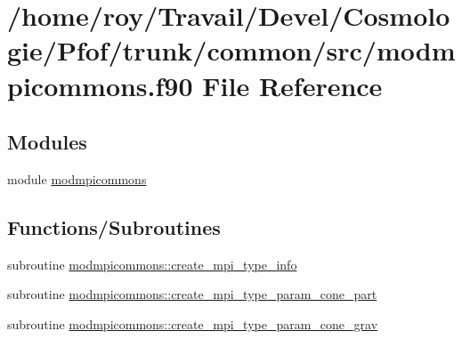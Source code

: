 \hypertarget{modmpicommons_8f90}{}\section{/home/roy/\+Travail/\+Devel/\+Cosmologie/\+Pfof/trunk/common/src/modmpicommons.f90 File Reference}
\label{modmpicommons_8f90}
\subsection*{Modules}
\begin{DoxyCompactItemize}
\item 
module \hyperlink{namespacemodmpicommons}{modmpicommons}
\end{DoxyCompactItemize}
\subsection*{Functions/\+Subroutines}
\begin{DoxyCompactItemize}
\item 
subroutine \hyperlink{namespacemodmpicommons_a5a540130814e6928b787a72f0dd0eaa9}{modmpicommons\+::create\+\_\+mpi\+\_\+type\+\_\+info}
\item 
subroutine \hyperlink{namespacemodmpicommons_afff785e5098b377ea1b360480c9f5757}{modmpicommons\+::create\+\_\+mpi\+\_\+type\+\_\+param\+\_\+cone\+\_\+part}
\item 
subroutine \hyperlink{namespacemodmpicommons_a32e80100f7e49ad7eed9bac495789eb6}{modmpicommons\+::create\+\_\+mpi\+\_\+type\+\_\+param\+\_\+cone\+\_\+grav}
\end{DoxyCompactItemize}

